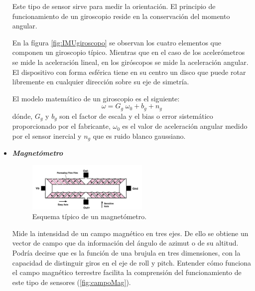 \begin{itemize}
		Este tipo de sensor sirve para medir la orientación. El principio de funcionamiento de un giroscopio reside en la conservación del momento angular. 
		
		En la fígura \ref{fig:IMUgiroscopo} se observan los cuatro elementos que componen un giroscopio típico. Mientras que en el caso de los acelerómetros se mide la aceleración lineal, en los giróscopos se mide la aceleración angular. El dispositivo con forma esférica tiene en su centro un disco que puede rotar libremente en cualquier dirección sobre su eje de simetría. 
				
		
		
		El modelo matemático de un giroscopio es el siguiente:
		\begin{equation}
			\label{eq:modelogiroscopo}
			\omega = G_{g}\; \omega_{0} + b_{g} + n_{g}
		\end{equation}
		dónde, $ G_{g} $ y $ b_{g} $ son el factor de escala y el bias o error sistemático proporcionado por el fabricante, $\omega_{0} $ es el valor de aceleración angular medido por el sensor inercial y $ n_{g} $ que es ruido blanco gaussiano.
		
			
		\item \textit{\textbf{Magnetómetro}}	
		\begin{figure}[H]
			\centering
			\includegraphics[width=0.55\textwidth]{./img/IMUmagnetometro}
			\caption{Esquema típico de un magnetómetro. \cite{juanDiego}} 
			\label{fig:IMUmagneto}
		\end{figure} 
		
		Mide la intensidad de un campo magnético en tres ejes. De ello se obtiene un vector de campo que da información del ángulo de azimut o de su altitud. Podría decirse que es la función de una brujula en tres dimensiones, con la capacidad de distinguir giros en el eje de roll y pitch. Entender cómo funciona el campo magnético terrestre facilita la comprensión del funcionamiento de este tipo de sensores (\ref{fig:campoMag}).
		

\end{itemize}
